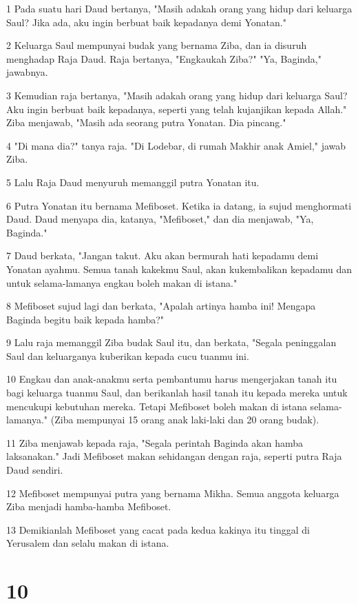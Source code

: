 \par 1 Pada suatu hari Daud bertanya, "Masih adakah orang yang hidup dari keluarga Saul? Jika ada, aku ingin berbuat baik kepadanya demi Yonatan."
\par 2 Keluarga Saul mempunyai budak yang bernama Ziba, dan ia disuruh menghadap Raja Daud. Raja bertanya, "Engkaukah Ziba?" "Ya, Baginda," jawabnya.
\par 3 Kemudian raja bertanya, "Masih adakah orang yang hidup dari keluarga Saul? Aku ingin berbuat baik kepadanya, seperti yang telah kujanjikan kepada Allah." Ziba menjawab, "Masih ada seorang putra Yonatan. Dia pincang."
\par 4 "Di mana dia?" tanya raja. "Di Lodebar, di rumah Makhir anak Amiel," jawab Ziba.
\par 5 Lalu Raja Daud menyuruh memanggil putra Yonatan itu.
\par 6 Putra Yonatan itu bernama Mefiboset. Ketika ia datang, ia sujud menghormati Daud. Daud menyapa dia, katanya, "Mefiboset," dan dia menjawab, "Ya, Baginda."
\par 7 Daud berkata, "Jangan takut. Aku akan bermurah hati kepadamu demi Yonatan ayahmu. Semua tanah kakekmu Saul, akan kukembalikan kepadamu dan untuk selama-lamanya engkau boleh makan di istana."
\par 8 Mefiboset sujud lagi dan berkata, "Apalah artinya hamba ini! Mengapa Baginda begitu baik kepada hamba?"
\par 9 Lalu raja memanggil Ziba budak Saul itu, dan berkata, "Segala peninggalan Saul dan keluarganya kuberikan kepada cucu tuanmu ini.
\par 10 Engkau dan anak-anakmu serta pembantumu harus mengerjakan tanah itu bagi keluarga tuanmu Saul, dan berikanlah hasil tanah itu kepada mereka untuk mencukupi kebutuhan mereka. Tetapi Mefiboset boleh makan di istana selama-lamanya." (Ziba mempunyai 15 orang anak laki-laki dan 20 orang budak).
\par 11 Ziba menjawab kepada raja, "Segala perintah Baginda akan hamba laksanakan." Jadi Mefiboset makan sehidangan dengan raja, seperti putra Raja Daud sendiri.
\par 12 Mefiboset mempunyai putra yang bernama Mikha. Semua anggota keluarga Ziba menjadi hamba-hamba Mefiboset.
\par 13 Demikianlah Mefiboset yang cacat pada kedua kakinya itu tinggal di Yerusalem dan selalu makan di istana.

\chapter{10}

